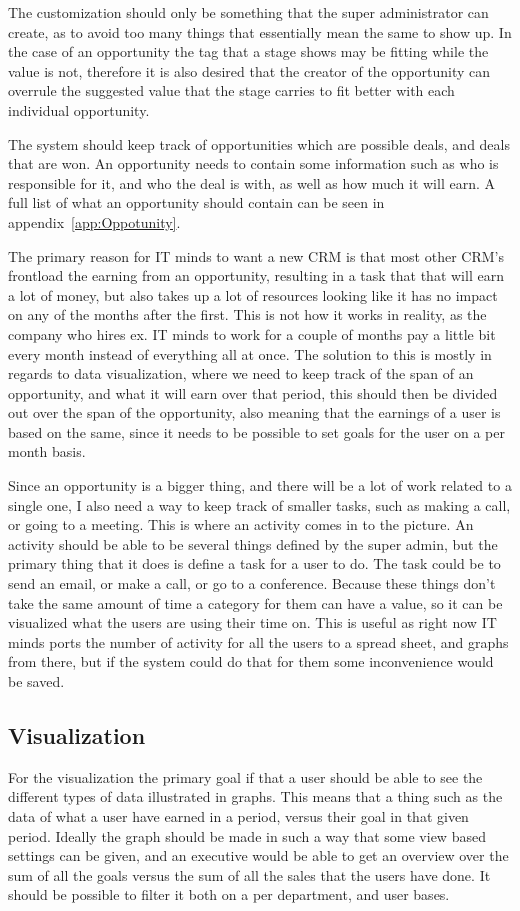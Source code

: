 The customization should only be something that the super administrator can create, as to avoid too many things that essentially mean the same to show up. In the case of an opportunity the tag that a stage shows may be fitting while the value is not, therefore it is also desired that the creator of the opportunity can overrule the suggested value that the stage carries to fit better with each individual opportunity.

The system should keep track of opportunities which are possible deals, and deals that are won. An opportunity needs to contain some information such as who is responsible for it, and who the deal is with, as well as how much it will earn. A full list of what an opportunity should contain can be seen in appendix~\ref{app:Oppotunity}.

The primary reason for IT minds to want a new CRM is that most other CRM's frontload the earning from an opportunity, resulting in a task that that will earn a lot of money, but also takes up a lot of resources looking like it has no impact on any of the months after the first. This is not how it works in reality, as the company who hires ex. IT minds to work for a couple of months pay a little bit every month instead of everything all at once. The solution to this is mostly in regards to data visualization, where we need to keep track of the span of an opportunity, and what it will earn over that period, this should then be divided out over the span of the opportunity, also meaning that the earnings of a user is based on the same, since it needs to be possible to set goals for the user on a per month basis.

Since an opportunity is a bigger thing, and there will be a lot of work related to a single one, I also need a way to keep track of smaller tasks, such as making a call, or going to a meeting. This is where an activity comes in to the picture. An activity should be able to be several things defined by the super admin, but the primary thing that it does is define a task for a user to do. The task could be to send an email, or make a call, or go to a conference. Because these things don't take the same amount of time a category for them can have a value, so it can be visualized what the users are using their time on. This is useful as right now IT minds ports the number of activity for all the users to a spread sheet, and graphs from there, but if the system could do that for them some inconvenience would be saved.

\subsection{Visualization}
\label{sub:Visualization}
For the visualization the primary goal if that a user should be able to see the different types of data illustrated in graphs. This means that a thing such as the data of what a user have earned in a period, versus their goal in that given period. Ideally the graph should be made in such a way that some view based settings can be given, and an executive would be able to get an overview over the sum of all the goals versus the sum of all the sales that the users have done. It should be possible to filter it both on a per department, and user bases.

